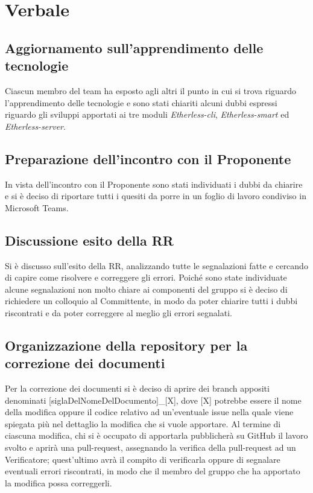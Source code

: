 \section{Verbale}

	\subsection{Aggiornamento sull'apprendimento delle tecnologie}
		Ciascun membro del team ha esposto agli altri il punto in cui si trova riguardo l'apprendimento delle tecnologie e sono stati chiariti alcuni dubbi espressi riguardo gli sviluppi apportati ai tre moduli \textit{Etherless-cli}, \textit{Etherless-smart} ed \textit{Etherless-server}.
		
	\subsection{Preparazione dell'incontro con il Proponente}
		In vista dell'incontro con il Proponente sono stati individuati i dubbi da chiarire e si è deciso di riportare tutti i quesiti da porre in un foglio di lavoro condiviso in Microsoft Teams.
		
	\subsection{Discussione esito della RR} 
		Si è discusso sull'esito della RR, analizzando tutte le segnalazioni fatte e cercando di capire come risolvere e correggere gli errori.
		Poiché sono state individuate alcune segnalazioni non molto chiare ai componenti del gruppo si è deciso di richiedere un colloquio al Committente, in modo da poter chiarire tutti i dubbi riscontrati e da poter correggere al meglio gli errori segnalati.
	
	\subsection{Organizzazione della repository per la correzione dei documenti}
		Per la correzione dei documenti si è deciso di aprire dei branch appositi denominati [siglaDelNomeDelDocumento]\_[X], dove [X] potrebbe essere il nome della modifica oppure il codice relativo ad un'eventuale issue nella quale viene spiegata più nel dettaglio la modifica che si vuole apportare.
		Al termine di ciascuna modifica, chi si è occupato di apportarla pubblicherà su GitHub il lavoro svolto e aprirà una pull-request, assegnando la verifica della pull-request ad un Verificatore; quest'ultimo avrà il compito di verificarla oppure di segnalare eventuali errori riscontrati, in modo che il membro del gruppo che ha apportato la modifica possa correggerli.
	
